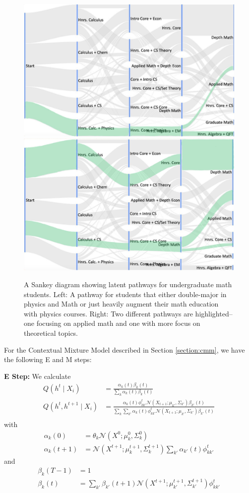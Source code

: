 \documentclass{edm_template}
\begin{document}
\begin{figure}[h]
    \centering
    \includegraphics[width=0.48\linewidth]{figures/physics_highlight.jpg}
    \quad 
    \includegraphics[width=0.48\linewidth]{figures/math_highlight.jpg}
    \caption{A Sankey diagram showing latent pathways for undergraduate math students. Left: A pathway for students that either double-major in physics and Math or just heavily augment their math education with physics courses. Right: Two different pathways are highlighted--one focusing on applied math and one with more focus on theoretical topics.}
    \label{fig:math-sankey}
\end{figure}

For the Contextual Mixture Model described in Section \ref{section:cmm}, we have the following E and M steps:

\textbf{E Step:}
We calculate
\begin{align*}
Q(h^t \mid X_i) &= \frac{\alpha_k(t) \beta_k(t)}{\sum_k \alpha_k(t) \beta_k(t)} \\
Q(h^t, h^{t+1} \mid X_i) &= \frac{\alpha_k(t) \phi^t_{k k'} \mathcal{N}(X_{t+1};\mu_{k'},\Sigma_{k'}) \beta_{k'}(t)}{\sum_k \sum_{k'} \alpha_k(t) \phi^t_{k k'} \mathcal{N}(X_{t+1};\mu_{k'},\Sigma_{k'}) \beta_{k'}(t)} \\
\end{align*}
with 
\begin{align*}
\alpha_k(0) &= \theta_k \mathcal{N}(X^0; \mu_k^0, \Sigma_k^0)  \\
\alpha_k(t+1) &= \mathcal{N}(X^{t+1}; \mu_k^{t+1}, \Sigma_k^{t+1}) \sum_{k'} \alpha_{k'}(t) \phi^t_{kk'}
\end{align*}
and
\begin{align*}
\beta_k(T-1) &= 1\\
\beta_k(t) &= \sum_{k'} \beta_{k'}(t+1) \mathcal{N}(X^{t+1}; \mu_{k'}^{t+1}, \Sigma_{k'}^{t+1}) \phi^t_{kk'}
\end{align*}
\end{document}
